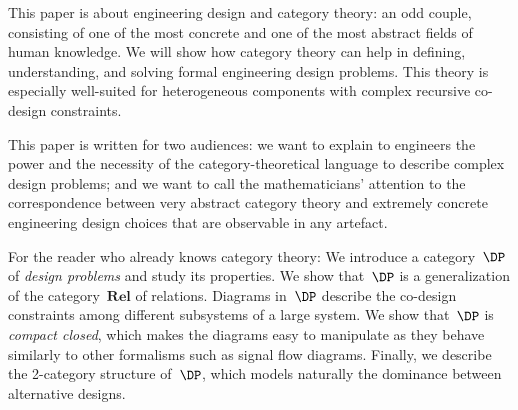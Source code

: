 \documentclass[paper=6in:9in,pagesize=pdftex,
 headinclude=off,footinclude=on,11pt,twoside]{scrbook}
\begin{document}
\maketitle
    This paper is about engineering design and
    category theory: an odd couple, consisting of one of the most concrete and
    one of the most abstract fields of human knowledge.
    We will show how category theory can help in defining, understanding, and
    solving formal engineering design problems.
    This theory is especially well-suited for
    heterogeneous components with complex
   recursive co-design constraints.


    This paper is written for two audiences: we
    want to explain to engineers the power and the necessity of the
    category-theoretical language to describe complex design problems; and we
    want to call the mathematicians' attention to the correspondence between
    very abstract category theory and extremely concrete engineering design
    choices that are observable in any artefact.


    For the reader who already knows category theory: We introduce a category~$\DP$ of
    \emph{design problems} and study its properties. We show that~$\DP$ is a
    generalization of the category~$\textbf{Rel}$ of relations.  Diagrams
    in~$\DP$ describe the co-design constraints among different subsystems of a
    large system. We show that~$\DP$ is \emph{compact closed}, which makes the
    diagrams easy to manipulate as they behave similarly to other formalisms
    such as signal flow diagrams. Finally, we describe the 2-category structure
    of~$\DP$, which models naturally the dominance between alternative designs.
\end{document}
